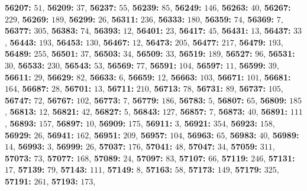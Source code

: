 \textsf{\bfseries 56207:} $51$, \textsf{\bfseries 56209:} $37$, \textsf{\bfseries 56237:} $55$, \textsf{\bfseries 56239:} $85$, \textsf{\bfseries 56249:} $146$, \textsf{\bfseries 56263:} $40$, \textsf{\bfseries 56267:} $229$, \textsf{\bfseries 56269:} $189$, \textsf{\bfseries 56299:} $26$, \textsf{\bfseries 56311:} $236$, \textsf{\bfseries 56333:} $180$, \textsf{\bfseries 56359:} $74$, \textsf{\bfseries 56369:} $7$, \textsf{\bfseries 56377:} $305$, \textsf{\bfseries 56383:} $74$, \textsf{\bfseries 56393:} $12$, \textsf{\bfseries 56401:} $23$, \textsf{\bfseries 56417:} $45$, \textsf{\bfseries 56431:} $13$, \textsf{\bfseries 56437:} $33$, \textsf{\bfseries 56443:} $193$, \textsf{\bfseries 56453:} $130$, \textsf{\bfseries 56467:} $12$, \textsf{\bfseries 56473:} $205$, \textsf{\bfseries 56477:} $217$, \textsf{\bfseries 56479:} $193$, \textsf{\bfseries 56489:} $255$, \textsf{\bfseries 56501:} $37$, \textsf{\bfseries 56503:} $34$, \textsf{\bfseries 56509:} $33$, \textsf{\bfseries 56519:} $189$, \textsf{\bfseries 56527:} $96$, \textsf{\bfseries 56531:} $30$, \textsf{\bfseries 56533:} $230$, \textsf{\bfseries 56543:} $53$, \textsf{\bfseries 56569:} $77$, \textsf{\bfseries 56591:} $104$, \textsf{\bfseries 56597:} $11$, \textsf{\bfseries 56599:} $39$, \textsf{\bfseries 56611:} $29$, \textsf{\bfseries 56629:} $82$, \textsf{\bfseries 56633:} $6$, \textsf{\bfseries 56659:} $12$, \textsf{\bfseries 56663:} $103$, \textsf{\bfseries 56671:} $101$, \textsf{\bfseries 56681:} $164$, \textsf{\bfseries 56687:} $28$, \textsf{\bfseries 56701:} $13$, \textsf{\bfseries 56711:} $210$, \textsf{\bfseries 56713:} $78$, \textsf{\bfseries 56731:} $89$, \textsf{\bfseries 56737:} $105$, \textsf{\bfseries 56747:} $72$, \textsf{\bfseries 56767:} $102$, \textsf{\bfseries 56773:} $7$, \textsf{\bfseries 56779:} $186$, \textsf{\bfseries 56783:} $5$, \textsf{\bfseries 56807:} $65$, \textsf{\bfseries 56809:} $185$, \textsf{\bfseries 56813:} $12$, \textsf{\bfseries 56821:} $42$, \textsf{\bfseries 56827:} $5$, \textsf{\bfseries 56843:} $127$, \textsf{\bfseries 56857:} $7$, \textsf{\bfseries 56873:} $40$, \textsf{\bfseries 56891:} $111$, \textsf{\bfseries 56893:} $157$, \textsf{\bfseries 56897:} $10$, \textsf{\bfseries 56909:} $175$, \textsf{\bfseries 56911:} $3$, \textsf{\bfseries 56921:} $354$, \textsf{\bfseries 56923:} $158$, \textsf{\bfseries 56929:} $26$, \textsf{\bfseries 56941:} $162$, \textsf{\bfseries 56951:} $209$, \textsf{\bfseries 56957:} $104$, \textsf{\bfseries 56963:} $65$, \textsf{\bfseries 56983:} $40$, \textsf{\bfseries 56989:} $14$, \textsf{\bfseries 56993:} $3$, \textsf{\bfseries 56999:} $26$, \textsf{\bfseries 57037:} $176$, \textsf{\bfseries 57041:} $48$, \textsf{\bfseries 57047:} $34$, \textsf{\bfseries 57059:} $311$, \textsf{\bfseries 57073:} $73$, \textsf{\bfseries 57077:} $168$, \textsf{\bfseries 57089:} $24$, \textsf{\bfseries 57097:} $83$, \textsf{\bfseries 57107:} $66$, \textsf{\bfseries 57119:} $246$, \textsf{\bfseries 57131:} $17$, \textsf{\bfseries 57139:} $79$, \textsf{\bfseries 57143:} $111$, \textsf{\bfseries 57149:} $8$, \textsf{\bfseries 57163:} $58$, \textsf{\bfseries 57173:} $149$, \textsf{\bfseries 57179:} $325$, \textsf{\bfseries 57191:} $261$, \textsf{\bfseries 57193:} $173$, 
